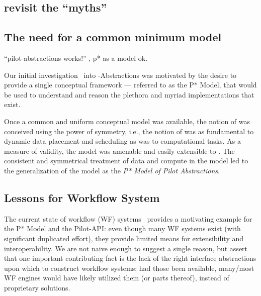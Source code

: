 \documentclass{sig-alternate}
\begin{document}



\subsection{revisit the ``myths''}

\subsection{The need for a common minimum model}

``pilot-abstractions works!'' , p* as a model ok.


Our initial investigation~\cite{Luckow:2008la} into
\pilot-Abstractions was motivated by the desire to provide a single
conceptual framework --- referred to as the P* Model, that would be
used to understand and reason the plethora and myriad \pilotjob
implementations that exist.

 
Once a common and uniform conceptual model was available, the notion
of \pilotdata was conceived using the power of symmetry, i.e., the
notion of \pilotdata was as fundamental to dynamic data placement and
scheduling as \pilotjobs was to computational tasks. As a measure of
validity, the \pstar model was amenable and easily extensible to
\pilotdata.  The consistent and symmetrical treatment of data and
compute in the model led to the generalization of the model as the
{\it P* Model of Pilot Abstractions}.


\subsection{Lessons for Workflow System}

The current state of workflow (WF) systems~\cite{nsf-workflow,1196459}
provides a motivating example for the P* Model and the Pilot-API: even
though many WF systems exist (with significant duplicated effort),
they provide limited means for extensibility and interoperability.  We
are not naive enough to suggest a single reason, but assert that one
important contributing fact is the lack of the right interface
abstractions upon which to construct workflow systems; had those been
available, many/most WF engines would have likely utilized them (or
parts thereof), instead of proprietary solutions.
\end{document}
